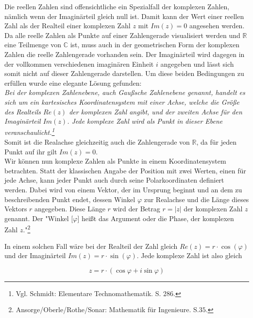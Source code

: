 \documentclass[a4paper,12pt]{article} %
\begin{document}
Die reellen Zahlen sind offensichtliche ein Spezialfall der komplexen Zahlen, nämlich wenn der Imaginärteil gleich null ist.
Damit kann der Wert einer reellen Zahl als der Realteil einer komplexen Zahl $z$ mit $Im(z)=0$ angesehen werden.
Da alle reelle Zahlen als Punkte auf einer Zahlengerade visualisiert werden und $\mathbb{R}$ eine Teilmenge von $\mathbb{C}$ ist, muss auch in der geometrischen Form der komplexen Zahlen die reelle Zahlengerade vorhanden sein.
Der Imaginärteil wird dagegen in der vollkommen verschiedenen imaginären Einheit $i$ angegeben und lässt sich somit nicht auf dieser Zahlengerade darstellen.
Um diese beiden Bedingungen zu erfüllen wurde eine elegante Lösung gefunden:\\


\noindent \emph{Bei der komplexen Zahlenebene, auch Gaußsche Zahlenebene genannt, handelt es sich um ein kartesisches Koordinatensystem mit einer Achse, welche die Größe des Realteils $Re(z)$ der komplexen Zahl angibt, und der zweiten Achse für den Imaginärteil $Im(z)$. Jede komplexe Zahl wird als Punkt in dieser Ebene veranschaulicht.\footnote{Vgl. Schmidt: Elementare Technomathematik. S. $286$.}}\\


Somit ist die Realachse gleichzeitig auch die Zahlengerade von $\mathbb{R}$, da für jeden Punkt auf ihr gilt $Im(z)=0$.\\



Wir können nun komplexe Zahlen als Punkte in einem Koordinatensystem betrachten.
Statt der klassischen Angabe der Position mit zwei Werten, einen für jede Achse, kann jeder Punkt auch durch seine Polarkoordinaten definiert werden.
Dabei wird von einem Vektor, der im Ursprung beginnt und an dem zu beschreibenden Punkt endet, dessen Winkel $\varphi$ zur Realachse und die Länge dieses Vektors $r$ angegeben. Diese Länge $r$ wird der Betrag $r=|z|$ der komplexen Zahl $z$ genannt.
Der "Winkel [$\varphi$] heißt das Argument oder die Phase, der komplexen Zahl $z$."\footnote{Ansorge/Oberle/Rothe/Sonar: Mathematik für Ingenieure. S.$35$.}

In einem solchen Fall wäre bei der Realteil der Zahl gleich $Re(z)=r\cdot \cos(\varphi)$ und der Imaginärteil $Im(z)=r\cdot \sin(\varphi)$.
Jede komplexe Zahl ist also gleich

\begin{equation}\label{eq.trigon}
	\boxed{z=r\cdot(\cos\varphi+i \sin\varphi)}	
\end{equation}
\end{document}
